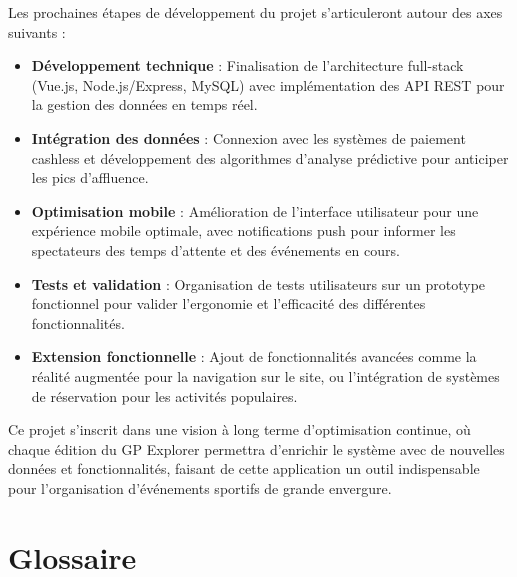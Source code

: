 \documentclass[12pt,a4paper]{article}
\begin{document}
Les prochaines étapes de développement du projet s'articuleront autour des axes suivants :

\begin{itemize}
    \item \textbf{Développement technique} : Finalisation de l'architecture full-stack (Vue.js, Node.js/Express, MySQL) avec implémentation des API REST pour la gestion des données en temps réel.
    
    \item \textbf{Intégration des données} : Connexion avec les systèmes de paiement cashless et développement des algorithmes d'analyse prédictive pour anticiper les pics d'af\-fluence.
    
    \item \textbf{Optimisation mobile} : Amélioration de l'interface utilisateur pour une expérience mobile optimale, avec notifications push pour informer les spectateurs des temps d'attente et des événements en cours.
    
    \item \textbf{Tests et validation} : Organisation de tests utilisateurs sur un prototype fonctionnel pour valider l'ergonomie et l'efficacité des différentes fonctionnalités.
    
    \item \textbf{Extension fonctionnelle} : Ajout de fonctionnalités avancées comme la réalité augmentée pour la navigation sur le site, ou l'intégration de systèmes de réservation pour les activités populaires.
\end{itemize}

Ce projet s'inscrit dans une vision à long terme d'optimisation continue, où chaque édition du GP Explorer permettra d'enrichir le système avec de nouvelles données et fonctionnalités, faisant de cette application un outil indispensable pour l'organisation d'événements sportifs de grande envergure.

\newpage
\section*{Glossaire}
\end{document}
